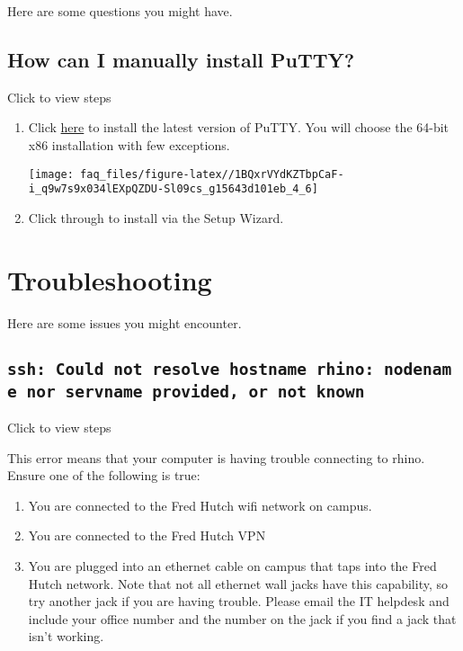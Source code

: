 \documentclass[
]{book}
\providecommand{\tightlist}{%
  \setlength{\itemsep}{0pt}\setlength{\parskip}{0pt}}
\begin{document}
Here are some questions you might have.

\hypertarget{manual-putty}{%
\subsection{How can I manually install PuTTY?}\label{manual-putty}}

Click to view steps

\begin{enumerate}
\def\labelenumi{\arabic{enumi}.}
\item
  Click \href{https://www.chiark.greenend.org.uk/~sgtatham/putty/latest.html}{here} to install the latest version of PuTTY. You will choose the 64-bit x86 installation with few exceptions.

  \texttt{[image: faq\_files/figure-latex//1BQxrVYdKZTbpCaF-i\_q9w7s9x034lEXpQZDU-Sl09cs\_g15643d101eb\_4\_6]}
\item
  Click through to install via the Setup Wizard.
\end{enumerate}

\hypertarget{troubleshooting}{%
\section{Troubleshooting}\label{troubleshooting}}

Here are some issues you might encounter.

\hypertarget{ssh-could-not-resolve-hostname-rhino-nodename-nor-servname-provided-or-not-known}{%
\subsection*{\texorpdfstring{\texttt{ssh:\ Could\ not\ resolve\ hostname\ rhino:\ nodename\ nor\ servname\ provided,\ or\ not\ known}}{ssh: Could not resolve hostname rhino: nodename nor servname provided, or not known}}\label{ssh-could-not-resolve-hostname-rhino-nodename-nor-servname-provided-or-not-known}}

Click to view steps

This error means that your computer is having trouble connecting to rhino. Ensure one of the following is true:

\begin{enumerate}
\def\labelenumi{\arabic{enumi}.}
\tightlist
\item
  You are connected to the Fred Hutch wifi network on campus.
\item
  You are connected to the Fred Hutch VPN
\item
  You are plugged into an ethernet cable on campus that taps into the Fred Hutch network. Note that not all ethernet wall jacks have this capability, so try another jack if you are having trouble. Please email the IT helpdesk and include your office number and the number on the jack if you find a jack that isn't working.
\end{enumerate}
\end{document}
